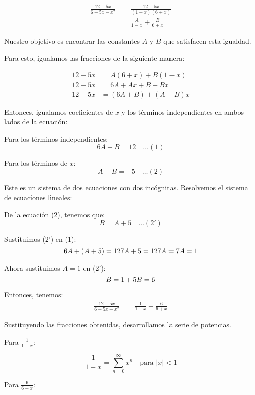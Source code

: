 \documentclass{article}
\begin{document}
    $$
    \begin{aligned}
    \frac{12-5 x}{6-5 x-x^{2}} & =\frac{12-5 x}{(1-x)(6+x)} \\
    & =\frac{A}{1-x}+\frac{B}{6+x}
    \end{aligned}
    $$

    Nuestro objetivo es encontrar las constantes \(A\) y \(B\) que satisfacen esta igualdad.

    Para esto, igualamos las fracciones de la siguiente manera:

    $$
    \begin{aligned}
    12 - 5x & = A(6 + x) + B(1 - x) \\
    12 - 5x & = 6A + Ax + B - Bx \\
    12 - 5x & = (6A + B) + (A - B)x
    \end{aligned}
    $$

    Entonces, igualamos coeficientes de \(x\) y los términos independientes en ambos lados de la ecuación:

    Para los términos independientes:
    $$
    6A + B = 12 \quad \dots (1)
    $$

    Para los términos de \(x\):
    $$
    A - B = -5 \quad \dots (2)
    $$

    Este es un sistema de dos ecuaciones con dos incógnitas. Resolvemos el sistema de ecuaciones lineales:

    De la ecuación (2), tenemos que:
    $$
    B = A + 5 \quad \dots (2')
    $$

    Sustituimos (2') en (1):
    $$
    6A + (A + 5) = 12 \\
    7A + 5 = 12 \\
    7A = 7 \\
    A = 1
    $$

    Ahora sustituimos \(A = 1\) en (2'):
    $$
    B = 1 + 5 \\
    B = 6
    $$

    Entonces, tenemos:
    $$
    \begin{aligned}
    \frac{12-5 x}{6-5 x-x^{2}} & =\frac{1}{1-x}+\frac{6}{6+x}
    \end{aligned}
    $$

    Sustituyendo las fracciones obtenidas, desarrollamos la serie de potencias.

    Para \(\frac{1}{1-x}\):

    \[
    \frac{1}{1-x} = \sum_{n=0}^{\infty} x^{n} \quad \text{para } |x|<1
    \]

    Para \(\frac{6}{6+x}\):
\end{document}
